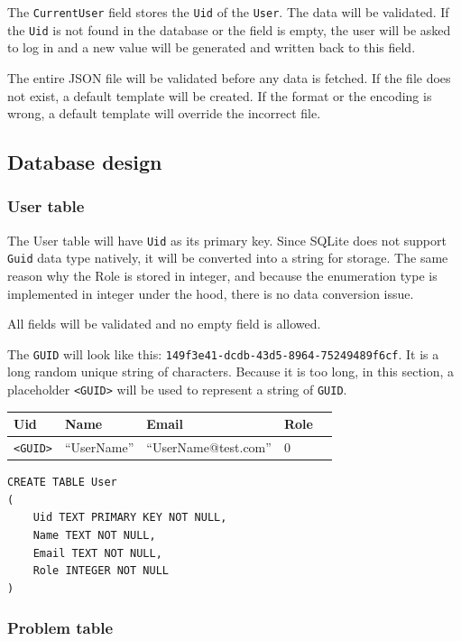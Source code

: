 \documentclass[a4paper]{report}
\begin{document}
The \verb|CurrentUser| field stores the \verb|Uid| of the \verb|User|. The data will be validated. If the \verb|Uid| is not found in the database or the field is empty, the user will be asked to log in and a new value will be generated and written back to this field.

The entire JSON file will be validated before any data is fetched. If the file does not exist, a default template will be created. If the format or the encoding is wrong, a default template will override the incorrect file.

\subsection{Database design}
\label{subsec:database design}

\subsubsection{User table}

The User table will have \verb|Uid| as its primary key. Since SQLite does not support \verb|Guid| data type natively, it will be converted into a string for storage. The same reason why the Role is stored in integer, and because the enumeration type is implemented in integer under the hood, there is no data conversion issue.

All fields will be validated and no empty field is allowed.

The \verb|GUID| will look like this: \verb|149f3e41-dcdb-43d5-8964-75249489f6cf|. It is a long random unique string of characters. Because it is too long, in this section, a placeholder \verb|<GUID>| will be used to represent a string of \verb|GUID|.

\begin{tabulary}{\textwidth}{|L|L|L|L|L|}
    \hline
    Uid & Name & Email & Role \\
    \hline
    \verb|<GUID>| & ``UserName'' & ``UserName@test.com'' & 0 \\
    \hline
\end{tabulary}

\begin{verbatim}
CREATE TABLE User
(
    Uid TEXT PRIMARY KEY NOT NULL,
    Name TEXT NOT NULL,
    Email TEXT NOT NULL,
    Role INTEGER NOT NULL
)
\end{verbatim}

\subsubsection{Problem table}
\end{document}
